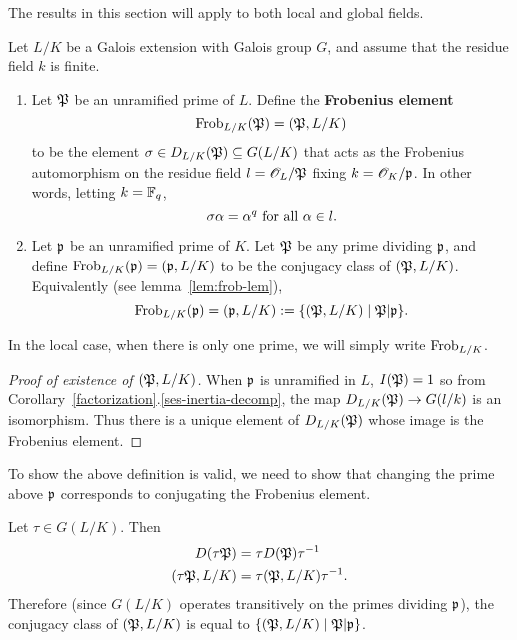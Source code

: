 The results in this section will apply to both local and global fields.
\begin{df}
Let $L/K$ be a Galois extension  with Galois group $G$, and assume that the residue field $k$ is finite. %
\begin{enumerate}
\item Let $\mathfrak{P}$ be an unramified prime of $L$. Define the \textbf{Frobenius element} 
\[\operatorname{Frob}_{L/K}(\mathfrak{P})=(\mathfrak{P},L/K)\]
to be the element $\sigma\in D_{L/K}(\mathfrak{P})\subseteq G(L/K)$ that acts as the Frobenius automorphism on the residue field $l=\mathscr{O}_L/\mathfrak{P}$ fixing $k=\mathscr{O}_K/\mathfrak{p}$. In other words, letting $k=\mathbb{F}_q$,
\[\sigma\alpha =\alpha^q\text{ for all }\alpha\in l.\]
\item Let $\mathfrak{p}$ be an unramified prime of $K$. %
Let $\mathfrak{P}$ be any prime dividing $\mathfrak{p}$, and define $\text{Frob}_{L/K}(\mathfrak{p})=(\mathfrak{p},L/K)$ to be the conjugacy class of $(\mathfrak{P},L/K)$. Equivalently (see lemma~\ref{lem:frob-lem}),
\[
\operatorname{Frob}_{L/K}(\mathfrak{p})=(\mathfrak{p},L/K):=\{(\mathfrak{P},L/K)\mid \mathfrak{P}|\mathfrak{p}\}.
\]
\end{enumerate}
In the local case, when there is only one prime, we will simply write $\operatorname{Frob}_{L/K}$.
\end{df}
\begin{proof}[Proof of existence of $(\mathfrak{P},L/K)$]
When $\mathfrak{p}$ is unramified in $L$, $I(\mathfrak{P})=1$ so from Corollary~\ref{factorization}.\ref{ses-inertia-decomp}, the map $D_{L/K}(\mathfrak{P})\to G(l/k)$ is an isomorphism. Thus there is a unique element of $D_{L/K}(\mathfrak{P})$ whose image is the Frobenius element.
\end{proof}
To show the above definition is valid, we need to show that changing the prime above $\mathfrak{p}$ corresponds to conjugating the Frobenius element.
\begin{lem}
Let $\tau\in G(L/K)$. Then
\begin{align*}
D(\tau \mathfrak{P})&=\tau D(\mathfrak{P})\tau^{-1}\\
(\tau \mathfrak{P},L/K)&=\tau (\mathfrak{P},L/K)\tau^{-1}.
\end{align*}
Therefore (since $G(L/K)$ operates transitively on the primes dividing $\mathfrak{p}$), the conjugacy class of $(\mathfrak{P}, L/K)$ is equal to $\{(\mathfrak{P},L/K)\mid \mathfrak{P}|\mathfrak{p}\}$.
\end{lem}
